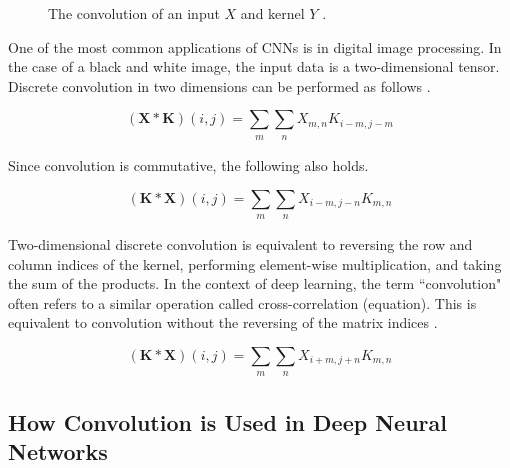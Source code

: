 \documentclass{article}
\begin{document}
\begin{figure}[h!]
    \caption{The convolution of an input \(X\) and kernel \(Y\) {\protect\cite{riebesell_tikz_2020}.}}
    \label{fig:conv-1d}
\end{figure}




One of the most common applications of CNNs is in digital image processing. In the case of a black and white image, the input data is a two-dimensional tensor. Discrete convolution in two dimensions can be performed as follows \cite{Goodfellow-et-al-2016}. %

\[(\bm{X}*\bm{K})(i,j) = \sum\limits_{\substack{m}}\sum\limits_{\substack{n}}X_{m,n}K_{i-m,j-m}\]

Since convolution is commutative, the following also holds. 

\[(\bm{K}*\bm{X})(i,j) = \sum\limits_{\substack{m}}\sum\limits_{\substack{n}}X_{i-m,j-n}K_{m,n}\]

Two-dimensional discrete convolution is equivalent to reversing the row and column indices of the kernel, performing element-wise multiplication, and taking the sum of the products. In the context of deep learning, the term ``convolution" often refers to a similar operation called cross-correlation (equation). This is equivalent to convolution without the reversing of the matrix indices \cite{Goodfellow-et-al-2016}. 

\[(\bm{K}*\bm{X})(i,j) = \sum\limits_{\substack{m}}\sum\limits_{\substack{n}} X_{i+m,j+n}K_{m,n}\]


\subsection{How Convolution is Used in Deep Neural Networks}
\end{document}
